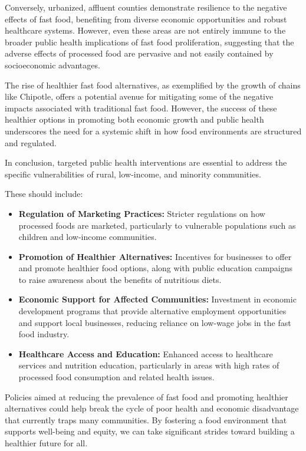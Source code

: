 \documentclass[letterpaper, 11pt]{report}
\begin{document}
Conversely, urbanized, affluent counties demonstrate resilience to the negative effects of fast food, benefiting from diverse economic opportunities and robust healthcare systems. However, even these areas are not entirely immune to the broader public health implications of fast food proliferation, suggesting that the adverse effects of processed food are pervasive and not easily contained by socioeconomic advantages.

The rise of healthier fast food alternatives, as exemplified by the growth of chains like Chipotle, offers a potential avenue for mitigating some of the negative impacts associated with traditional fast food. However, the success of these healthier options in promoting both economic growth and public health underscores the need for a systemic shift in how food environments are structured and regulated.

In conclusion, targeted public health interventions are essential to address the specific vulnerabilities of rural, low-income, and minority communities.

These should include:
\begin{itemize}
    \item \textbf{Regulation of Marketing Practices:} Stricter regulations on how processed foods are marketed, particularly to vulnerable populations such as children and low-income communities.
    \item \textbf{Promotion of Healthier Alternatives:} Incentives for businesses to offer and promote healthier food options, along with public education campaigns to raise awareness about the benefits of nutritious diets.
    \item \textbf{Economic Support for Affected Communities:} Investment in economic development programs that provide alternative employment opportunities and support local businesses, reducing reliance on low-wage jobs in the fast food industry.
    \item \textbf{Healthcare Access and Education:} Enhanced access to healthcare services and nutrition education, particularly in areas with high rates of processed food consumption and related health issues.
\end{itemize}

Policies aimed at reducing the prevalence of fast food and promoting healthier alternatives could help break the cycle of poor health and economic disadvantage that currently traps many communities. By fostering a food environment that supports well-being and equity, we can take significant strides toward building a healthier future for all.
\end{document}

